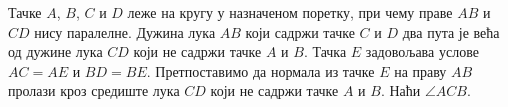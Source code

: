 Тачке $A$, $B$, $C$ и $D$ леже на кругу у назначеном поретку, при чему праве
$AB$ и $CD$ нису паралелне.
Дужина лука $AB$ који садржи тачке $C$ и $D$ два пута је већа од дужине лука
$CD$ који не садржи тачке $A$ и $B$.
Тачка $E$ задовољава услове $AC = AE$ и $BD = BE$.
Претпоставимо да нормала из тачке $E$ на праву $AB$ пролази кроз средиште лука
$CD$ који не садржи тачке $A$ и $B$.
Наћи $\angle ACB$.

\solution

